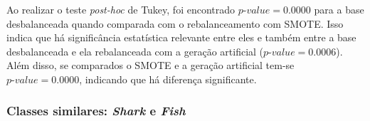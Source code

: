 Ao realizar o teste \textit{post-hoc} de Tukey, foi encontrado $\textit{p-value} = 0.0000$ para a base desbalanceada quando comparada com o rebalanceamento com SMOTE. Isso indica que há significância estatística relevante entre eles e também entre a base desbalanceada e ela rebalanceada com a geração artificial ($\textit{p-value} = 0.0006$). Além disso, se comparados o SMOTE e a geração artificial tem-se $\textit{p-value} = 0.0000$, indicando que há diferença significante.



\subsubsection{Classes similares: \textit{Shark} e \textit{Fish}}


